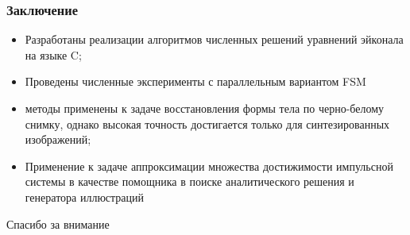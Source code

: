 \documentclass[hyperref={unicode=true},professionalfont]{beamer}
\newcommand{\stamp}{
	\begin{frame}[plain,noframenumbering]
		\begin{table}[h!]
			\flushright
			\vspace{5cm}
			\begin{adjustbox}{max width=0.7\textwidth}
				\begin{tabular}{
					|>{\footnotesize}p{0.8cm}|
					>{\footnotesize}p{0.8cm}|
					>{\footnotesize}p{2.2cm}|
					>{\footnotesize}p{1.1cm}|
					>{\footnotesize}p{0.8cm}|
					>{\footnotesize}p{5cm}|
					>{\footnotesize}p{0.1cm}|
					>{\footnotesize}p{0.1cm}|
					>{\footnotesize}p{0.1cm}|
					>{\footnotesize}p{0.8cm}|
					>{\footnotesize}p{1.4cm}|
				}
					\hline
					&&&&& \multicolumn{6}{>{\footnotesize}c|}{\multirow{3}{*}{\Large 0.043.00.00 ПЗ}} \\ \cline{1-5}
					&&&&& \multicolumn{6}{>{\footnotesize}c|}{} \\ \cline{1-5}
					Изм. & Лист & № Документа & Подпись & Дата & \multicolumn{6}{>{\footnotesize}c|}{} \\ \hline
					\multicolumn{2}{|>{\footnotesize}l|}{Разработал}
                    & Апанович Д.В. &  &  &
                                            \multirow{4}{5cm}{\centering
                                            Параллельный алгоритм
                                            численного решения
                                            анизотропного уравнения эйконала} & \multicolumn{3}{>{\footnotesize}l|}{Лит.} & Лист & Листов \\ \cline{1-5}\cline{7-11}
					\multicolumn{2}{|>{\footnotesize}l|}{Проверил}
                    & Казаков А.Л. &  &  &  & У & & & \insertframenumber & \inserttotalframenumber \\ \cline{1-5}\cline{7-11}
					\multicolumn{2}{|>{\footnotesize}l|}{Нормоконтролер}
                    & Казаков А.Л. &  &  &  & \multicolumn{5}{>{\footnotesize}l|}{} \\ \cline{1-5}
					\multicolumn{2}{|>{\footnotesize}l|}{} &  &  &  &  & \multicolumn{5}{>{\footnotesize}l|}{Кафедра АС, гр. ИСТм-16-1} \\ \cline{1-5}
					\multicolumn{2}{|>{\footnotesize}l|}{Утвердил}
                    & Бахвалов С.В. &  &  &  & \multicolumn{5}{>{\footnotesize}l|}{} \\ \hline

				\end{tabular}
			\end{adjustbox}
		\end{table}

	\end{frame}
}
\renewcommand{\stamp}{}
\begin{document}
\begin{frame}
  \frametitle{Заключение}
  \begin{itemize}
  \item Разработаны реализации алгоритмов численных решений уравнений
    эйконала на языке C;
  \item Проведены численные эксперименты с параллельным вариантом FSM
  \item методы применены к задаче восстановления формы тела по черно-белому
    снимку, однако высокая точность достигается только для
    синтезированных изображений;
  \item Применение к задаче аппроксимации множества достижимости
    импульсной системы в качестве помощника в поиске аналитического
    решения и генератора иллюстраций
  \end{itemize}

\end{frame}
\stamp


\begin{frame}
  \Huge Спасибо за внимание
\end{frame}
\stamp
\end{document}
